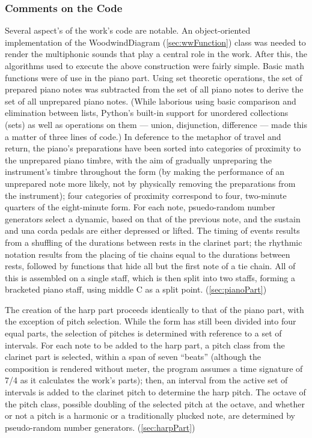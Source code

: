 \subsubsection{Comments on the Code}
Several aspect's of the work's code are notable. An object-oriented implementation of the WoodwindDiagram (\ref{sec:wwFunction}) class was needed to render the multiphonic sounds that play a central role in the work. After this, the algorithms used to execute the above construction were fairly simple. Basic math functions were of use in the piano part. Using set theoretic operations, the set of prepared piano notes was subtracted from the set of all piano notes to derive the set of all unprepared piano notes. (While laborious using basic comparison and elimination between lists, Python's built-in support for unordered collections (sets) as well as operations on them --- union, disjunction, difference --- made this a matter of three lines of code.) In deference to the metaphor of travel and return, the piano's preparations have been sorted into categories of proximity to the unprepared piano timbre, with the aim of gradually unpreparing the instrument's timbre throughout the form (by making the performance of an unprepared note more likely, not by physically removing the preparations from the instrument); four categories of proximity correspond to four, two-minute quarters of the eight-minute form. For each note, psuedo-random number generators select a dynamic, based on that of the previous note, and the sustain and una corda pedals are either depressed or lifted. The timing of events results from a shuffling of the durations between rests in the clarinet part; the rhythmic notation results from the placing of tie chains equal to the durations between rests, followed by functions that hide all but the first note of a tie chain. All of this is assembled on a single staff, which is then split into two staffs, forming a bracketed piano staff, using middle C as a split point. (\ref{sec:pianoPart})

The creation of the harp part proceeds identically to that of the piano part, with the exception of pitch selection. While the form has still been divided into four equal parts, the selection of pitches is determined with reference to a set of intervals. For each note to be added to the harp part, a pitch class from the clarinet part is selected, within a span of seven ``beats'' (although the composition is rendered without meter, the program assumes a time signature of 7/4 as it calculates the work's parts); then, an interval from the active set of intervals is added to the clarinet pitch to determine the harp pitch. The octave of the pitch class, possible doubling of the selected pitch at the octave, and whether or not a pitch is a harmonic or a traditionally plucked note, are determined by pseudo-random number generators. (\ref{sec:harpPart})

